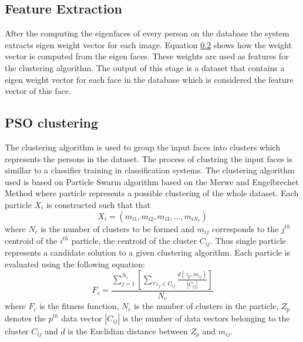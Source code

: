 \documentclass[a4paper,twoside]{article}
\begin{document}
\subsection{Feature Extraction}

After the computing the eigenfaces of every person on the database the system extracts eigen weight vector for each image. Equation \ref{} shows how the weight vector is computed from the eigen faces. These weights are used as features for the clustering algorithm. The output of this stage is a dataset that contains a eigen weight vector for each face in the database which is considered the feature vector of this face. 


\subsection{PSO clustering}


The clustering algorithm is used to group the input faces into clusters which represents the persons in the dataset. The process of clustring the input faces is simillar to a classifier training in classification systems.    The clustering algorithm used is based on Particle Swarm algorithm  based on the Merwe and Engelbrechet \cite{psoclustering} Method where particle represents a possible clustering of the whole dataset.  Each particle $X_i$ is constructed such that that
\begin{equation}
X_i=\left( m_{i1}, m_{i2}, m_{i3},\dots, m_{iN_c}\right)
\end{equation}
where $N_c$ is the number of clusters to be formed and $m_{ij}$ corresponds to the $j^{th}$ centroid of the  $i^{th}$ particle, the centroid of the cluster $C_{ij}$. Thus single particle represents a candidate solution to a given clustering algorithm. Each particle is evaluated using the following equation:
\begin{equation}
F_c  = \frac{{\sum\nolimits_{j = 1}^{N_c } {\left[ {\sum\limits_{\forall z_j  \in C_{ij} } {\frac{{d(z_p ,m_{ij} )}}{{\left| {C_{ij} } \right|}}} } \right]} }}{{N_c }}
\end{equation}
where $F_c$ is the fitness function, $N_c$ is the number of clusters in the particle, $Z_p$ denotes the $p^{th}$ data vector $\left| {C_{ij} } \right|$ is the number of data vectors belonging to the cluster $C_{ij}$ and $d$ is the Euclidian distance between $Z_p$ and $m_{ij}$.
\end{document}
